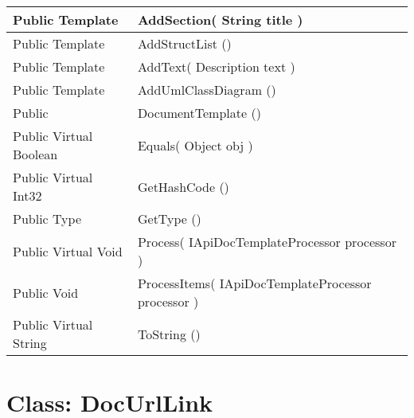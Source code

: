 \documentclass[11pt, oneside, a4paper]{book}
\begin{document}
\begin{center}
\begin{tabular}{| p{3cm} | p{12cm} | }
\hline
 Public  Template &  AddSection(\hypertarget{SoftwareEngineeringTools.{}Documentation.{}DocumentTemplate.{}AddSection\_String}{} String  title  )\\
\hline
 Public  Template &  AddStructList ()\hypertarget{SoftwareEngineeringTools.{}Documentation.{}DocumentTemplate.{}AddStructList}{}\\
\hline
 Public  Template &  AddText(\hypertarget{SoftwareEngineeringTools.{}Documentation.{}DocumentTemplate.{}AddText\_Description}{} Description  text  )\\
\hline
 Public  Template &  AddUmlClassDiagram ()\hypertarget{SoftwareEngineeringTools.{}Documentation.{}DocumentTemplate.{}AddUmlClassDiagram}{}\\
\hline
 Public  &  DocumentTemplate ()\hypertarget{SoftwareEngineeringTools.{}Documentation.{}DocumentTemplate.{}DocumentTemplate}{}\\
\hline
 Public  Virtual  Boolean &  Equals(\hypertarget{SoftwareEngineeringTools.{}Documentation.{}DocumentTemplate.{}Equals\_Object}{} Object  obj  )\\
\hline
 Public  Virtual  Int32 &  GetHashCode ()\hypertarget{SoftwareEngineeringTools.{}Documentation.{}DocumentTemplate.{}GetHashCode}{}\\
\hline
 Public  Type &  GetType ()\hypertarget{SoftwareEngineeringTools.{}Documentation.{}DocumentTemplate.{}GetType}{}\\
\hline
 Public  Virtual  Void &  Process(\hypertarget{SoftwareEngineeringTools.{}Documentation.{}DocumentTemplate.{}Process\_IApiDocTemplateProcessor}{} IApiDocTemplateProcessor  processor  )\\
\hline
 Public  Void &  ProcessItems(\hypertarget{SoftwareEngineeringTools.{}Documentation.{}DocumentTemplate.{}ProcessItems\_IApiDocTemplateProcessor}{} IApiDocTemplateProcessor  processor  )\\
\hline
 Public  Virtual  String &  ToString ()\hypertarget{SoftwareEngineeringTools.{}Documentation.{}DocumentTemplate.{}ToString}{}\\
\hline
\end{tabular}
\end{center}
 


\hypertarget{SoftwareEngineeringTools.{}Documentation.{}DocUrlLink}{}
\section{Class: DocUrlLink}
\end{document}
